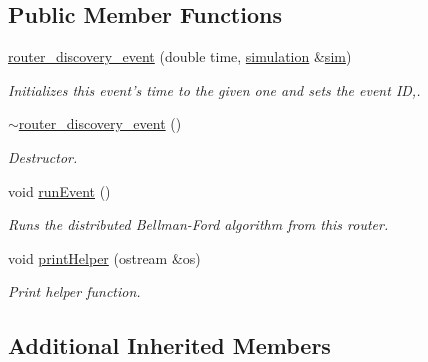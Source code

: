 \subsection*{Public Member Functions}
\begin{DoxyCompactItemize}
\item 
\hypertarget{classrouter__discovery__event_af2a8465db9af4bde900f3bb1ccd8cde0}{\hyperlink{classrouter__discovery__event_af2a8465db9af4bde900f3bb1ccd8cde0}{router\-\_\-discovery\-\_\-event} (double time, \hyperlink{classsimulation}{simulation} \&\hyperlink{classevent_a08c6d828bfb6f5539dcd1491e8ac77d2}{sim})}\label{classrouter__discovery__event_af2a8465db9af4bde900f3bb1ccd8cde0}

\begin{DoxyCompactList}\small\item\em Initializes this event's time to the given one and sets the event I\-D,. \end{DoxyCompactList}\item 
\hypertarget{classrouter__discovery__event_a3c8b9beed6b979ee4240d1c0740b9488}{\hyperlink{classrouter__discovery__event_a3c8b9beed6b979ee4240d1c0740b9488}{$\sim$router\-\_\-discovery\-\_\-event} ()}\label{classrouter__discovery__event_a3c8b9beed6b979ee4240d1c0740b9488}

\begin{DoxyCompactList}\small\item\em Destructor. \end{DoxyCompactList}\item 
\hypertarget{classrouter__discovery__event_a170768272244ac6578a7c38ffd82733f}{void \hyperlink{classrouter__discovery__event_a170768272244ac6578a7c38ffd82733f}{run\-Event} ()}\label{classrouter__discovery__event_a170768272244ac6578a7c38ffd82733f}

\begin{DoxyCompactList}\small\item\em Runs the distributed Bellman-\/\-Ford algorithm from this router. \end{DoxyCompactList}\item 
void \hyperlink{classrouter__discovery__event_a32edb9914a54c925bbcb8a48d26451ed}{print\-Helper} (ostream \&os)
\begin{DoxyCompactList}\small\item\em Print helper function. \end{DoxyCompactList}\end{DoxyCompactItemize}
\subsection*{Additional Inherited Members}


